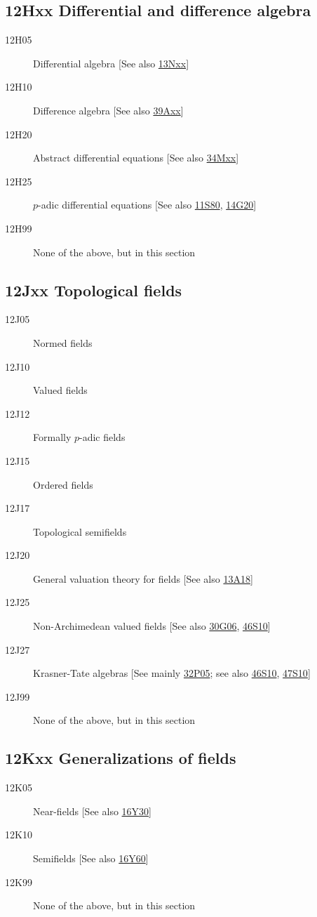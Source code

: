 \subsection*{12Hxx  Differential and difference algebra }\label{12Hxx}
\begin{description}  
\item [12H05]\label{12H05} Differential algebra [See also \hyperref[13Nxx]{13Nxx}]
\item [12H10]\label{12H10} Difference algebra [See also \hyperref[39Axx]{39Axx}]
\item [12H20]\label{12H20} Abstract differential equations [See also \hyperref[34Mxx]{34Mxx}]
\item [12H25]\label{12H25} $p$-adic differential equations [See also \hyperref[11S80]{11S80}, \hyperref[14G20]{14G20}]
\item [12H99]\label{12H99} None of the above, but in this section
\end{description}
\subsection*{12Jxx  Topological fields }\label{12Jxx}
\begin{description}  
\item [12J05]\label{12J05} Normed fields
\item [12J10]\label{12J10} Valued fields
\item [12J12]\label{12J12} Formally $p$-adic fields
\item [12J15]\label{12J15} Ordered fields
\item [12J17]\label{12J17} Topological semifields
\item [12J20]\label{12J20} General valuation theory for fields [See also \hyperref[13A18]{13A18}]
\item [12J25]\label{12J25} Non-Archimedean valued fields [See also \hyperref[30G06]{30G06}, \hyperref[46S10]{46S10}]
\item [12J27]\label{12J27} Krasner-Tate algebras [See mainly \hyperref[32P05]{32P05}; see also \hyperref[46S10]{46S10}, \hyperref[47S10]{47S10}]
\item [12J99]\label{12J99} None of the above, but in this section
\end{description}
\subsection*{12Kxx  Generalizations of fields }\label{12Kxx}
\begin{description}  
\item [12K05]\label{12K05} Near-fields [See also \hyperref[16Y30]{16Y30}]
\item [12K10]\label{12K10} Semifields [See also \hyperref[16Y60]{16Y60}]
\item [12K99]\label{12K99} None of the above, but in this section
\end{description}
